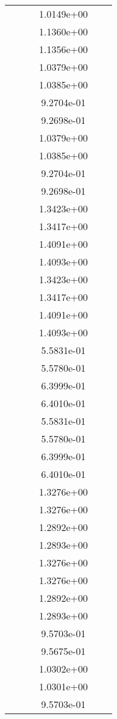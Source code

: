 \begin{xltabular}{\textwidth}{r|rS[table-format=1.3e+2]S[table-format=1.4e+2]S[table-format=1.4e+2]S[table-format=-1.5]}
&  &  & 1.0149e+00 & & \\
&  &  & 1.1360e+00 & & \\
&  &  & 1.1356e+00 & & \\
&  &  & 1.0379e+00 & & \\
&  &  & 1.0385e+00 & & \\
&  &  & 9.2704e-01 & & \\
&  &  & 9.2698e-01 & & \\
&  &  & 1.0379e+00 & & \\
&  &  & 1.0385e+00 & & \\
&  &  & 9.2704e-01 & & \\
&  &  & 9.2698e-01 & & \\
&  &  & 1.3423e+00 & & \\
&  &  & 1.3417e+00 & & \\
&  &  & 1.4091e+00 & & \\
&  &  & 1.4093e+00 & & \\
&  &  & 1.3423e+00 & & \\
&  &  & 1.3417e+00 & & \\
&  &  & 1.4091e+00 & & \\
&  &  & 1.4093e+00 & & \\
&  &  & 5.5831e-01 & & \\
&  &  & 5.5780e-01 & & \\
&  &  & 6.3999e-01 & & \\
&  &  & 6.4010e-01 & & \\
&  &  & 5.5831e-01 & & \\
&  &  & 5.5780e-01 & & \\
&  &  & 6.3999e-01 & & \\
&  &  & 6.4010e-01 & & \\
&  &  & 1.3276e+00 & & \\
&  &  & 1.3276e+00 & & \\
&  &  & 1.2892e+00 & & \\
&  &  & 1.2893e+00 & & \\
&  &  & 1.3276e+00 & & \\
&  &  & 1.3276e+00 & & \\
&  &  & 1.2892e+00 & & \\
&  &  & 1.2893e+00 & & \\
&  &  & 9.5703e-01 & & \\
&  &  & 9.5675e-01 & & \\
&  &  & 1.0302e+00 & & \\
&  &  & 1.0301e+00 & & \\
&  &  & 9.5703e-01 & & \\

\end{xltabular}

